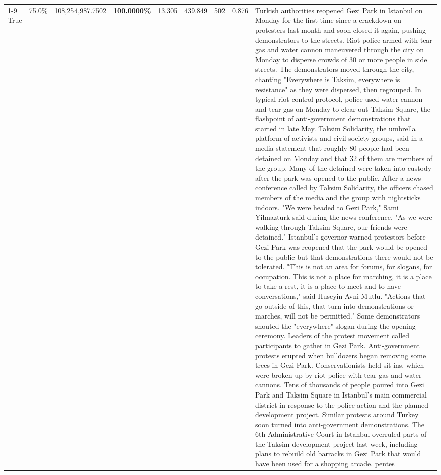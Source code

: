 \begin{table}[H]
\begin{tabular}{lllrlllll}
\cline{1-9}
True & 75.0\% & 108,254,987.7502 & \bfseries \color{red} 100.0000\% & 13.305 & 439.849 & 502 & 0.876 & Turkish authorities reopened Gezi Park in Istanbul on Monday for the first time since a crackdown on protesters last month and soon closed it again, pushing demonstrators to the streets. Riot police armed with tear gas and water cannon maneuvered through the city on Monday to disperse crowds of 30 or more people in side streets. The demonstrators moved through the city, chanting "Everywhere is Taksim, everywhere is resistance" as they were dispersed, then regrouped. In typical riot control protocol, police used water cannon and tear gas on Monday to clear out Taksim Square, the flashpoint of anti-government demonstrations that started in late May. Taksim Solidarity, the umbrella platform of activists and civil society groups, said in a media statement that roughly 80 people had been detained on Monday and that 32 of them are members of the group. Many of the detained were taken into custody after the park was opened to the public. After a news conference called by Taksim Solidarity, the officers chased members of the media and the group with nightsticks indoors. "We were headed to Gezi Park," Sami Yilmazturk said during the news conference. "As we were walking through Taksim Square, our friends were detained." Istanbul's governor warned protestors before Gezi Park was reopened that the park would be opened to the public but that demonstrations there would not be tolerated. "This is not an area for forums, for slogans, for occupation. This is not a place for marching, it is a place to take a rest, it is a place to meet and to have conversations," said Huseyin Avni Mutlu. "Actions that go outside of this, that turn into demonstrations or marches, will not be permitted." Some demonstrators shouted the "everywhere" slogan during the opening ceremony. Leaders of the protest movement called participants to gather in Gezi Park. Anti-government protests erupted when bulldozers began removing some trees in Gezi Park. Conservationists held sit-ins, which were broken up by riot police with tear gas and water cannons. Tens of thousands of people poured into Gezi Park and Taksim Square in Istanbul's main commercial district in response to the police action and the planned development project. Similar protests around Turkey soon turned into anti-government demonstrations. The 6th Administrative Court in Istanbul overruled parts of the Taksim development project last week, including plans to rebuild old barracks in Gezi Park that would have been used for a shopping arcade. pentes \\

\end{tabular}
\end{table}
